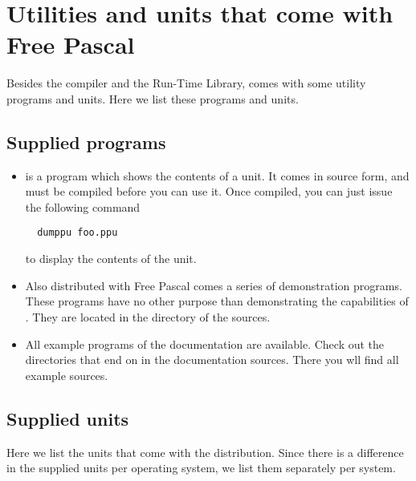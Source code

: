 \documentclass{report}
\begin{document}

\chapter{Utilities and units that come with Free Pascal}
Besides the compiler and the Run-Time Library, \fpk comes with some utility
programs and units. Here we list these programs and units. 

\section{Supplied programs}

\begin{itemize}
\item {} is a program which shows the contents of a \fpk unit. It
comes in source form, and must be compiled before you can use it. Once
compiled, you can just issue the following command
\begin{verbatim}
  dumppu foo.ppu
\end{verbatim}
to display the contents of the  unit.
\item Also distributed with Free Pascal comes a series of demonstration programs.
These programs have no other purpose than demonstrating the capabilities of
\fpk. They are located in the  directory of the sources.
\item All example programs of the documentation are available. Check out the
directories that end on  in the documentation sources. There you
wll find all example sources.
\end{itemize}


\section{Supplied units}
Here we list the units that come with the \fpk distribution. Since there is
a difference in the supplied units per operating system, we list them
separately per system.

%
%

\end{document}
